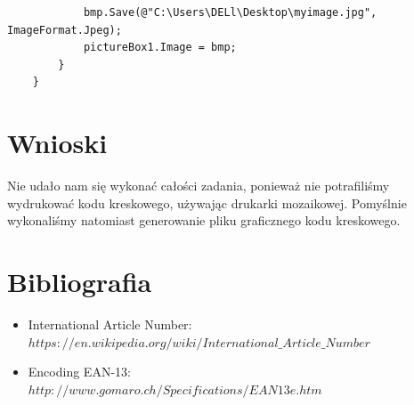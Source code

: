 \documentclass[12pt,a4paper,notitlepage]{report}
\begin{document}
\begin{adjustwidth}{0pt}{-50pt}
\begin{lstlisting}
            bmp.Save(@"C:\Users\DELl\Desktop\myimage.jpg", ImageFormat.Jpeg);
            pictureBox1.Image = bmp;
        }
    }

\end{lstlisting}

\end{adjustwidth}
\newpage
\section{Wnioski}
Nie udało nam się wykonać całości zadania, ponieważ nie potrafiliśmy wydrukować kodu kreskowego, używając drukarki mozaikowej. Pomyślnie wykonaliśmy natomiast generowanie pliku graficznego kodu kreskowego.
\section{Bibliografia}
\begin{itemize}
\item International Article Number:
\\
$https://en.wikipedia.org/wiki/International\_Article\_Number$
\item Encoding EAN-13:
\\
$http://www.gomaro.ch/Specifications/EAN13e.htm$
\end{itemize}
\end{document}

